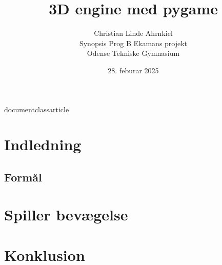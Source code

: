 documentclass{article}

\usepackage{amsmath}
\usepackage{graphicx}
\usepackage{hyperref}
\usepackage[utf8]{inputenc}
\usepackage{minted}

\title{3D engine med pygame}

\author{Christian Linde Ahrnkiel\\
Synopsis Prog B Ekamans projekt\\
Odense Tekniske Gymnasium
}

\date{28. feburar 2025}



\maketitle
\tableofcontents

\section{Indledning}
    \subsection{Formål}
    
\section{Spiller bevægelse}

\section{Konklusion}

